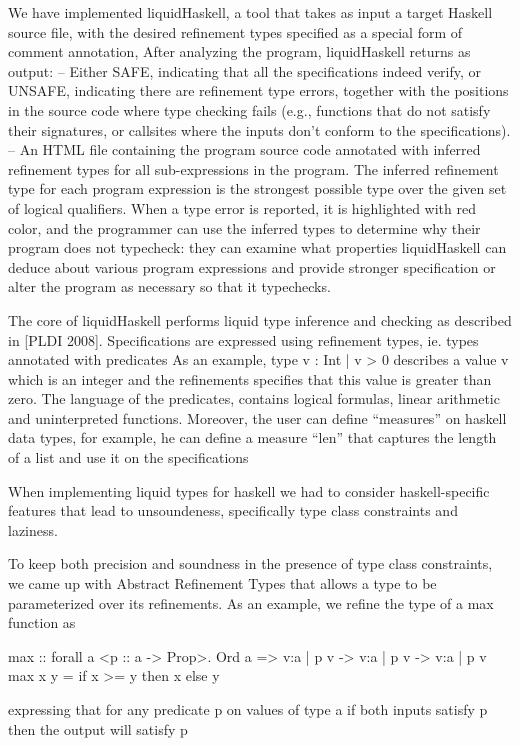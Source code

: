 \documentclass[10pt,a4paper]{article}
\begin{document}
We have implemented liquidHaskell, a tool that takes as input
a target Haskell source file, with the desired refinement types specified as a special
form of comment annotation,
After analyzing the program, liquidHaskell returns as output:
-- Either SAFE, indicating that all the specifications indeed verify, or UNSAFE, indicating there are refinement type errors, together with the positions in the source
code where type checking fails (e.g., functions that do not satisfy their signatures,
or callsites where the inputs don't conform to the specifications).
-- An HTML file containing the program source code annotated with inferred refinement types for all sub-expressions in the program. The inferred refinement type for
each program expression is the strongest possible type over the given set of logical qualifiers. When a type error is reported,  it is highlighted with red color, and the programmer can use the inferred
types to determine why their program does not typecheck: they can examine what
properties liquidHaskell can deduce about various program expressions and 
provide stronger specification or alter the program as necessary so that it typechecks.

The core of liquidHaskell performs liquid type inference and checking as described in [PLDI 2008].
Specifications are expressed using refinement types, ie. types annotated with predicates
As an example, type {v : Int | v > 0} describes a value v which is an integer and the refinements specifies that this value is greater than zero.
The language of the predicates, contains logical formulas, linear arithmetic and uninterpreted functions. Moreover, the user can define ``measures'' on haskell data types, for example, he can define a measure ``len'' that captures the length of a list and use it on the specifications 


When implementing liquid types for haskell we had to consider haskell-specific features that lead to unsoundeness,
specifically type class constraints and laziness.

To keep both precision and soundness in the presence of type class constraints, 
we came up with Abstract Refinement Types that allows a type to be parameterized over its refinements.
As an example, we refine the type of a max function as

max :: forall a <p :: a -> Prop>. Ord a => {v:a | p v} -> {v:a | p v} -> {v:a | p v}
max x y = if x >= y then x else y

expressing that for any predicate p on values of type a 
if both inputs satisfy p then the output will satisfy p
\end{document}
